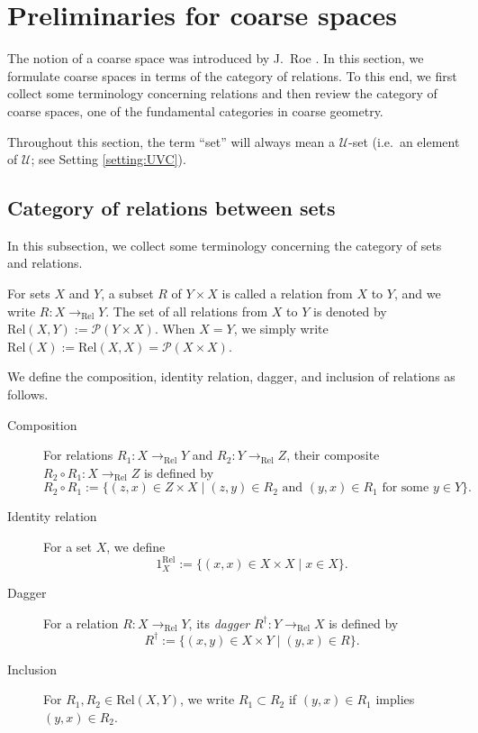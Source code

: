\documentclass[12pt, a4paper]{amsart}
\theoremstyle{definition}
\newcommand{\Rel}{\mathrm{Rel}}
\begin{document}
\section{Preliminaries for coarse spaces}\label{section:prelim_coarsespaces}

The notion of a coarse space was introduced by J.~Roe
\cite{Roe1993,Roe2003LectureCoarse}.
In this section, we formulate coarse spaces in terms of the category of
relations.
To this end, we first collect some terminology concerning relations and then
review the category of coarse spaces, one of the fundamental categories in
coarse geometry.

Throughout this section, the term ``set'' will always mean a
$\mathcal{U}$-set (i.e.~an element of $\mathcal{U}$; see Setting
\ref{setting:UVC}).

\subsection{Category of relations between sets}\label{section:categoryofrel}

In this subsection, we collect some terminology concerning the category of sets and relations.

For sets $X$ and $Y$, a subset $R$ of $Y\times X$ is called a relation from $X$ to $Y$, and we write
$R:X\rightarrow_{\Rel}Y$.
The set of all relations from $X$ to $Y$ is denoted by
$\Rel(X,Y):=\mathcal{P}(Y\times X)$.
When $X=Y$, we simply write
$\Rel(X):=\Rel(X,X)=\mathcal{P}(X\times X)$.

We define the composition, identity relation, dagger, and inclusion of relations as follows.

\begin{description}
\item[Composition]
For relations
$R_1:X\rightarrow_{\Rel}Y$ and
$R_2:Y\rightarrow_{\Rel}Z$,
their composite
$R_2\circ R_1:X\rightarrow_{\Rel}Z$
is defined by
\[
R_2\circ R_1
:=
\{
(z,x)\in Z\times X
\mid
(z,y)\in R_2
\text{ and }
(y,x)\in R_1
\text{ for some }
y\in Y
\}.
\]

\item[Identity relation]
For a set $X$, we define
\[
1_X^{\Rel}
:=
\{
(x,x)\in X\times X
\mid
x\in X
\}.
\]

\item[Dagger]
For a relation
$R:X\rightarrow_{\Rel}Y$,
its \emph{dagger}
$R^\dagger:Y\rightarrow_{\Rel}X$
is defined by
\[
R^\dagger
:=
\{
(x,y)\in X\times Y
\mid
(y,x)\in R
\}.
\]

\item[Inclusion]
For $R_1,R_2\in\Rel(X,Y)$,
we write
$R_1\subset R_2$
if $(y,x)\in R_1$ implies $(y,x)\in R_2$.
\end{description}
\end{document}
